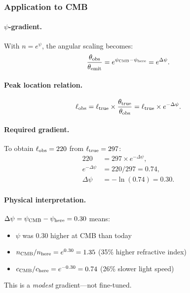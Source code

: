 \subsubsection{Application to CMB}

\paragraph{$\psi$-gradient.}
With $n = e^\psi$, the angular scaling becomes:
\begin{equation}
\frac{\theta_{\rm obs}}{\theta_{\rm emit}} = e^{\psi_{\rm CMB} - \psi_{\rm here}} = e^{\Delta\psi}.
\end{equation}

\paragraph{Peak location relation.}
\begin{equation}
\ell_{\rm obs} = \ell_{\rm true} \times \frac{\theta_{\rm true}}{\theta_{\rm obs}} = \ell_{\rm true} \times e^{-\Delta\psi}.
\end{equation}

\paragraph{Required gradient.}
To obtain $\ell_{\rm obs} = 220$ from $\ell_{\rm true} = 297$:
\begin{align}
220 &= 297 \times e^{-\Delta\psi}, \\
e^{-\Delta\psi} &= 220/297 = 0.74, \\
\Delta\psi &= -\ln(0.74) = 0.30.
\end{align}

\paragraph{Physical interpretation.}
$\Delta\psi = \psi_{\rm CMB} - \psi_{\rm here} = 0.30$ means:
\begin{itemize}[nosep]
\item $\psi$ was $0.30$ higher at CMB than today
\item $n_{\rm CMB}/n_{\rm here} = e^{0.30} = 1.35$ (35\% higher refractive index)
\item $c_{\rm CMB}/c_{\rm here} = e^{-0.30} = 0.74$ (26\% slower light speed)
\end{itemize}

This is a \textit{modest} gradient---not fine-tuned.

